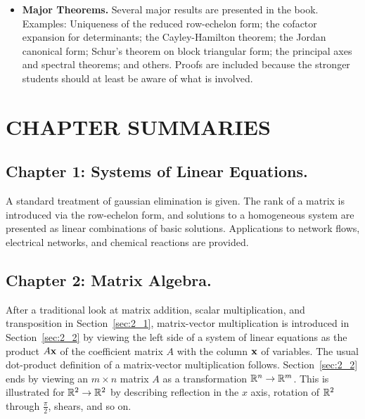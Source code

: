 \begin{itemize}
\item \textbf{Major Theorems.}
 Several major results are presented in the book. Examples: Uniqueness 
of the reduced row-echelon form; the cofactor expansion for 
determinants; the Cayley-Hamilton theorem; the Jordan canonical form; 
Schur's theorem on block triangular form; the principal axes and 
spectral theorems; and others. Proofs are included because the stronger 
students should at least be aware of what is involved.

\end{itemize}

\section*{CHAPTER SUMMARIES}


\subsection*{Chapter 1: Systems of Linear Equations.}


A standard treatment of gaussian 
elimination is given. The rank of a matrix is introduced via the 
row-echelon form, and solutions to a homogeneous system are presented as 
linear combinations of basic solutions. Applications to network flows, 
electrical networks, and chemical reactions are provided.



\subsection*{Chapter 2: Matrix Algebra.}


After a traditional look at matrix addition, scalar multiplication, and transposition in Section~\ref{sec:2_1}, matrix-vector multiplication is introduced in Section~\ref{sec:2_2} by viewing the left side of a system of linear equations as the product $A\textbf{x}$ of the coefficient matrix $A$ with the column $\textbf{x}$ of variables. The usual dot-product definition of a matrix-vector multiplication follows. Section~\ref{sec:2_2} ends by viewing an $m \times n$ matrix $A$ as a transformation $\mathbb{R}^n \to \mathbb{R}^m$. This is illustrated for $\mathbb{R}^2 \to \mathbb{R}^2$ by describing reflection in the $x$ axis, rotation of $\mathbb{R}^2$ through $\frac{\pi}{2}$, shears, and so on.


